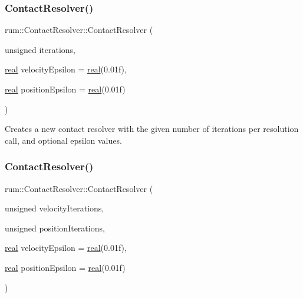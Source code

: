\subsubsection{\texorpdfstring{Contact\+Resolver()}{ContactResolver()}\hspace{0.1cm}{\footnotesize\ttfamily [1/2]}}
{\footnotesize\ttfamily rum\+::\+Contact\+Resolver\+::\+Contact\+Resolver (\begin{DoxyParamCaption}\item[{unsigned}]{iterations,  }\item[{\mbox{\hyperlink{namespacerum_a7e8cca23573d5eaead0f138cbaa4862c}{real}}}]{velocity\+Epsilon = {\ttfamily \mbox{\hyperlink{namespacerum_a7e8cca23573d5eaead0f138cbaa4862c}{real}}(0.01f)},  }\item[{\mbox{\hyperlink{namespacerum_a7e8cca23573d5eaead0f138cbaa4862c}{real}}}]{position\+Epsilon = {\ttfamily \mbox{\hyperlink{namespacerum_a7e8cca23573d5eaead0f138cbaa4862c}{real}}(0.01f)} }\end{DoxyParamCaption})\hspace{0.3cm}{\ttfamily [explicit]}}

Creates a new contact resolver with the given number of iterations per resolution call, and optional epsilon values. \mbox{\label{classrum_1_1_contact_resolver_a0d517774fa736afb5eb9098a5051761a}} 
\subsubsection{\texorpdfstring{Contact\+Resolver()}{ContactResolver()}\hspace{0.1cm}{\footnotesize\ttfamily [2/2]}}
{\footnotesize\ttfamily rum\+::\+Contact\+Resolver\+::\+Contact\+Resolver (\begin{DoxyParamCaption}\item[{unsigned}]{velocity\+Iterations,  }\item[{unsigned}]{position\+Iterations,  }\item[{\mbox{\hyperlink{namespacerum_a7e8cca23573d5eaead0f138cbaa4862c}{real}}}]{velocity\+Epsilon = {\ttfamily \mbox{\hyperlink{namespacerum_a7e8cca23573d5eaead0f138cbaa4862c}{real}}(0.01f)},  }\item[{\mbox{\hyperlink{namespacerum_a7e8cca23573d5eaead0f138cbaa4862c}{real}}}]{position\+Epsilon = {\ttfamily \mbox{\hyperlink{namespacerum_a7e8cca23573d5eaead0f138cbaa4862c}{real}}(0.01f)} }\end{DoxyParamCaption})}

